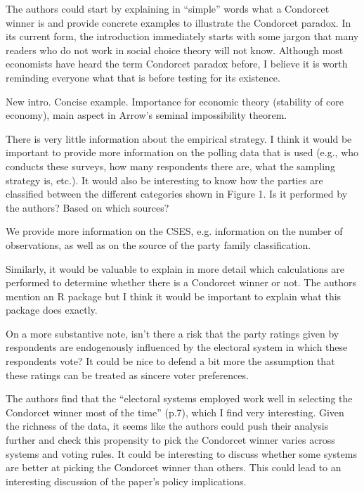 \documentclass[a4paper, 12pt]{scrartcl}
\theoremstyle{break}
\newenvironment{changes}{\par\color{violet}\par\addvspace{\baselineskip}}{\par\addvspace{\baselineskip}}
\begin{document}
\begin{changes}
	The authors could start by explaining in “simple” words what a Condorcet winner is and provide concrete examples to illustrate the Condorcet paradox. In its current form, the introduction immediately starts with some jargon that many readers who do not work in
	social choice theory will not know. Although most economists have heard the term Condorcet paradox before, I believe it is worth reminding everyone what that is before testing for its existence.
\end{changes}

New intro. Concise example. Importance for economic theory (stability of core economy), main aspect in Arrow's seminal impossibility theorem. 

\begin{changes}
	There is very little information about the empirical strategy. I think it would be important to provide more information on the polling data that is used (e.g., who conducts these surveys, how many respondents there are, what the sampling strategy is, etc.). It would also be
	interesting to know how the parties are classified between the different categories shown in Figure 1. Is it performed by the authors? Based on which sources?
\end{changes}

We provide more information on the CSES, e.g. information on the number of observations, as well as on the source of the party family classification.

\begin{changes}
	Similarly, it would be valuable to explain in more detail which calculations are performed to determine whether there is a Condorcet winner or not. The authors mention an R package but I think it would be important to explain what this package does exactly.
\end{changes}

\begin{changes}
	On a more substantive note, isn’t there a risk that the party ratings given by respondents are endogenously influenced by the electoral system in which these respondents vote? It could be nice to defend a bit more the assumption that these ratings can be treated as
	sincere voter preferences.
\end{changes}

\begin{changes}
	The authors ﬁnd that the “electoral systems employed work well in selecting the Condorcet winner most of the time” (p.7), which I ﬁnd very interesting. Given the richness of the data, it seems like the authors could push their analysis further and check this propensity to pick the
	Condorcet winner varies across systems and voting rules. It could be interesting to discuss whether some systems are better at picking the Condorcet winner than others. This could lead to an interesting discussion of the paper’s policy implications.
\end{changes}
\end{document}
